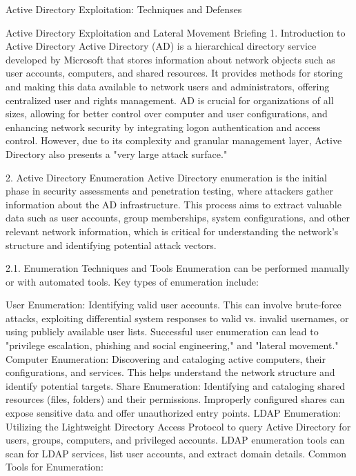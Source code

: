 Active Directory Exploitation: Techniques and Defenses

Active Directory Exploitation and Lateral Movement Briefing
1. Introduction to Active Directory
Active Directory (AD) is a hierarchical directory service developed by Microsoft that stores information about network objects such as user accounts, computers, and shared resources. It provides methods for storing and making this data available to network users and administrators, offering centralized user and rights management. AD is crucial for organizations of all sizes, allowing for better control over computer and user configurations, and enhancing network security by integrating logon authentication and access control. However, due to its complexity and granular management layer, Active Directory also presents a "very large attack surface."

2. Active Directory Enumeration
Active Directory enumeration is the initial phase in security assessments and penetration testing, where attackers gather information about the AD infrastructure. This process aims to extract valuable data such as user accounts, group memberships, system configurations, and other relevant network information, which is critical for understanding the network's structure and identifying potential attack vectors.

2.1. Enumeration Techniques and Tools
Enumeration can be performed manually or with automated tools. Key types of enumeration include:

User Enumeration: Identifying valid user accounts. This can involve brute-force attacks, exploiting differential system responses to valid vs. invalid usernames, or using publicly available user lists. Successful user enumeration can lead to "privilege escalation, phishing and social engineering," and "lateral movement."
Computer Enumeration: Discovering and cataloging active computers, their configurations, and services. This helps understand the network structure and identify potential targets.
Share Enumeration: Identifying and cataloging shared resources (files, folders) and their permissions. Improperly configured shares can expose sensitive data and offer unauthorized entry points.
LDAP Enumeration: Utilizing the Lightweight Directory Access Protocol to query Active Directory for users, groups, computers, and privileged accounts. LDAP enumeration tools can scan for LDAP services, list user accounts, and extract domain details.
Common Tools for Enumeration:

